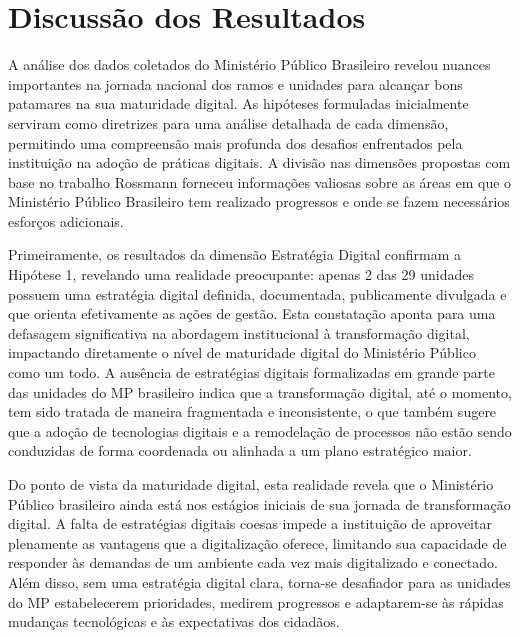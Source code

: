 \section{Discussão dos Resultados}

A análise dos dados coletados do Ministério Público Brasileiro revelou nuances importantes na jornada nacional dos ramos e unidades para alcançar bons patamares na sua maturidade digital. As hipóteses formuladas inicialmente serviram como diretrizes para uma análise detalhada de cada dimensão, permitindo uma compreensão mais profunda dos desafios enfrentados pela instituição na adoção de práticas digitais. A divisão nas dimensões propostas com base no trabalho Rossmann \cite{rossmann2018digital} forneceu informações valiosas sobre as áreas em que o Ministério Público Brasileiro tem realizado progressos e onde se fazem necessários esforços adicionais.

Primeiramente, os resultados da dimensão Estratégia Digital confirmam a Hipótese 1, revelando uma realidade preocupante: apenas 2 das 29 unidades possuem uma estratégia digital definida, documentada, publicamente divulgada e que orienta efetivamente as ações de gestão. Esta constatação aponta para uma defasagem significativa na abordagem institucional à transformação digital, impactando diretamente o nível de maturidade digital do Ministério Público como um todo. A ausência de estratégias digitais formalizadas em grande parte das unidades do MP brasileiro indica que a transformação digital, até o momento, tem sido tratada de maneira fragmentada e inconsistente, o que também sugere que a adoção de tecnologias digitais e a remodelação de processos não estão sendo conduzidas de forma coordenada ou alinhada a um plano estratégico maior.

Do ponto de vista da maturidade digital, esta realidade revela que o Ministério Público brasileiro ainda está nos estágios iniciais de sua jornada de transformação digital. A falta de estratégias digitais coesas impede a instituição de aproveitar plenamente as vantagens que a digitalização oferece, limitando sua capacidade de responder às demandas de um ambiente cada vez mais digitalizado e conectado. Além disso, sem uma estratégia digital clara, torna-se desafiador para as unidades do MP estabelecerem prioridades, medirem progressos e adaptarem-se às rápidas mudanças tecnológicas e às expectativas dos cidadãos.

